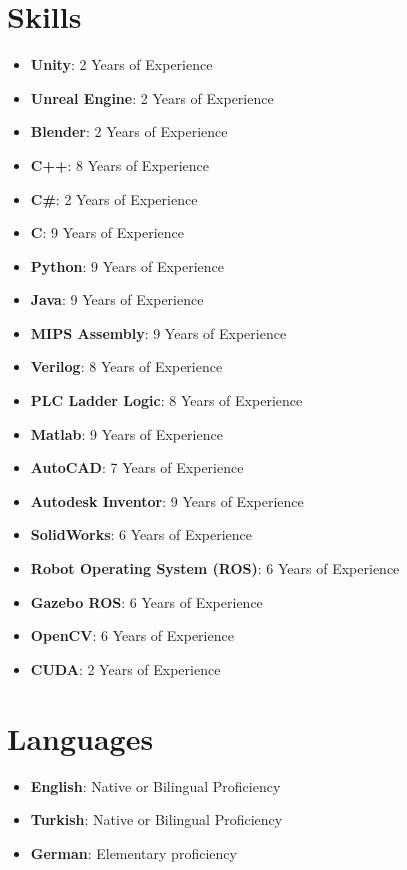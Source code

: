 \documentclass[letterpaper,11pt]{article}
\newcommand{\resumeSkillSimple}[1]{
  \item \small{#1}
}
\newcommand{\resumeSkillExperience}[2]{
  \item \small{\textbf{#1}: #2} \vspace{-10pt}
}
\newcommand{\resumeLanguage}[2]{
  \item
    \textbf{#1}: #2 \vspace{-10pt}
}
\newcommand{\resumeSubHeadingListStart}{\begin{itemize}[leftmargin=0.0in, label={}]}
\newcommand{\resumeSubHeadingListEnd}{\end{itemize}}
\begin{document}

\section{Skills}
\begin{itemize}[leftmargin=0.15in, label={}]
  \resumeSkillExperience{Unity}{2 Years of Experience}
  \resumeSkillExperience{Unreal Engine}{2 Years of Experience}
  \resumeSkillExperience{Blender}{2 Years of Experience}
  \resumeSkillExperience{C++}{8 Years of Experience}
  \resumeSkillExperience{C\#}{2 Years of Experience}
  \resumeSkillExperience{C}{9 Years of Experience}
  \resumeSkillExperience{Python}{9 Years of Experience}
  \resumeSkillExperience{Java}{9 Years of Experience}
  \resumeSkillExperience{MIPS Assembly}{9 Years of Experience}
  \resumeSkillExperience{Verilog}{8 Years of Experience}
  \resumeSkillExperience{PLC Ladder Logic}{8 Years of Experience}
  \resumeSkillExperience{Matlab}{9 Years of Experience}
  \resumeSkillExperience{AutoCAD}{7 Years of Experience}
  \resumeSkillExperience{Autodesk Inventor}{9 Years of Experience}
  \resumeSkillExperience{SolidWorks}{6 Years of Experience}
  \resumeSkillExperience{Robot Operating System (ROS)}{6 Years of Experience}
  \resumeSkillExperience{Gazebo ROS}{6 Years of Experience}
  \resumeSkillExperience{OpenCV}{6 Years of Experience}
  \resumeSkillExperience{CUDA}{2 Years of Experience}
\end{itemize}
\vspace{-10pt}

\section{Languages}
  \resumeSubHeadingListStart
    \resumeLanguage
      {English}{Native or Bilingual Proficiency}
    \resumeLanguage
      {Turkish}{Native or Bilingual Proficiency}
    \resumeLanguage
      {German}{Elementary proficiency}
  \resumeSubHeadingListEnd
\vspace{-10pt}
\end{document}
